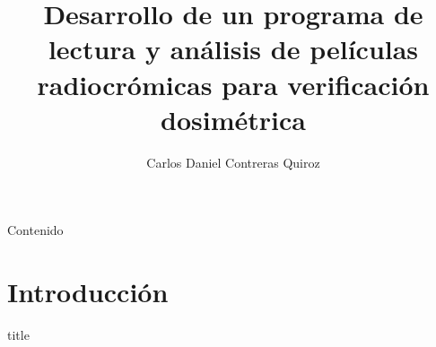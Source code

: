 \documentclass[12pt]{beamer}
\begin{document}
	\author{Carlos Daniel Contreras Quiroz}
	\title{Desarrollo de un programa de lectura y análisis de películas radiocrómicas para verificación dosimétrica}
	\begin{frame}[plain]
	\maketitle
\end{frame}

\begin{frame}{Contenido}
\tableofcontents
\end{frame}

\section{Introducción}
\begin{frame}
\vfill
\centering
\begin{beamercolorbox}[sep=8pt,center,shadow=true,rounded=true]{title}
	\insertsectionhead\par%
\end{beamercolorbox}
\vfill
\end{frame}
\end{document}
